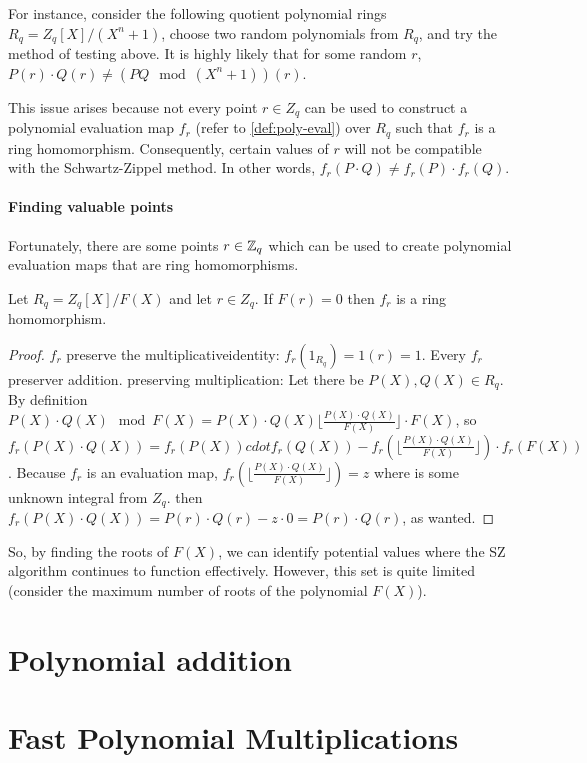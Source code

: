 For instance, consider the following quotient polynomial rings $R_q=Z_q[X]/(X^n+1)$,
choose two random polynomials from $R_q$, and try the method of testing above.
It is highly likely that for some random $r$, $P(r)\cdot Q(r) \ne (PQ \mod (X^n+1))(r)$.

This issue arises because not every point $r\in Z_q$ can be used to construct a
polynomial evaluation map $f_r$ (refer to \autoref{def:poly-eval}) 
over $R_q$ such that $f_r$ is a ring homomorphism. 
Consequently, certain values of $r$ will not be compatible with the Schwartz-Zippel method.
In other words, $f_r(P\cdot Q) \neq f_r(P)\cdot f_r(Q)$.


\paragraph{Finding valuable points}

Fortunately, there are some points $r\in \mathbb{Z}_q$ which can be used to create polynomial evaluation maps that 
are ring homomorphisms.
\begin{thm}
  Let $R_q=Z_q[X]/F(X)$ and let $r\in Z_q$. If $F(r)=0$ then $f_r$ is a ring homomorphism.
\end{thm}
\begin{proof}
  $f_r$ preserve the multiplicativeidentity: $f_r(1_{R_q}) = 1(r)=1$.
  Every $f_r$ preserver addition.
  preserving multiplication:
  Let there be $P(X), Q(X) \in R_q$. 
  By definition $P(X)\cdot Q(X) \mod F(X) = P(X)\cdot Q(X) \lfloor \frac{P(X)\cdot Q(X)}{F(X)} \rfloor \cdot F(X)$,
  so $f_r(P(X)\cdot Q(X))= f_r(P(X))cdot f_r(Q(X)) - f_r(\lfloor  \frac{P(X)\cdot Q(X)}{F(X)} \rfloor)\cdot f_r(F(X))$.
  Because $f_r$ is an evaluation map, $f_r(\lfloor  \frac{P(X)\cdot Q(X)}{F(X)} \rfloor)=z$ where is some unknown integral from $Z_q$.
  then $f_r(P(X)\cdot Q(X)) =P(r)\cdot Q(r) - z \cdot 0= P(r)\cdot Q(r)$, as wanted.
\end{proof}

So, by finding the roots of $F(X)$, we can identify potential values where 
the SZ algorithm continues to function effectively. 
However, this set is quite limited (consider the maximum number of roots of the polynomial $F(X)$).

\section{Polynomial addition}\label{polynomials:addition}
\section{Fast Polynomial Multiplications}\label{polynomial:multiplication}\label{section:fft}

